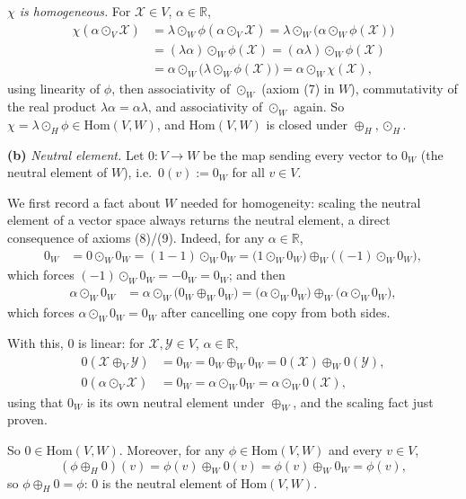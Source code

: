 \documentclass[11pt]{article}
\begin{document}
\emph{$\chi$ is homogeneous.} For $\mathcal X\in V$, $\alpha\in\mathbb R$,
\begin{align*}
\chi(\alpha\odot_V\mathcal X) &= \lambda\odot_W\phi(\alpha\odot_V\mathcal X) = \lambda\odot_W\big(\alpha\odot_W\phi(\mathcal X)\big) \\
&= (\lambda\alpha)\odot_W\phi(\mathcal X) = (\alpha\lambda)\odot_W\phi(\mathcal X) \\
&= \alpha\odot_W\big(\lambda\odot_W\phi(\mathcal X)\big) = \alpha\odot_W\chi(\mathcal X),
\end{align*}
using linearity of $\phi$, then associativity of $\odot_W$ (axiom (7) in $W$), commutativity of the real product $\lambda\alpha=\alpha\lambda$, and associativity of $\odot_W$ again. So $\chi=\lambda\odot_H\phi\in\mathrm{Hom}(V,W)$, and $\mathrm{Hom}(V,W)$ is closed under $\oplus_H,\odot_H$.

\textbf{(b)} \emph{Neutral element.} Let $0:V\to W$ be the map sending every vector to $0_W$ (the neutral element of $W$), i.e.\ $0(v):=0_W$ for all $v\in V$.

We first record a fact about $W$ needed for homogeneity: scaling the neutral element of a vector space always returns the neutral element, a direct consequence of axioms (8)/(9). Indeed, for any $\alpha\in\mathbb R$,
\begin{align*}
0_W &= 0\odot_W0_W = (1-1)\odot_W0_W = \big(1\odot_W0_W\big)\oplus_W\big((-1)\odot_W0_W\big),
\end{align*}
which forces $(-1)\odot_W0_W=-0_W=0_W$; and then
\begin{align*}
\alpha\odot_W0_W &= \alpha\odot_W\big(0_W\oplus_W0_W\big) = \big(\alpha\odot_W0_W\big)\oplus_W\big(\alpha\odot_W0_W\big),
\end{align*}
which forces $\alpha\odot_W0_W=0_W$ after cancelling one copy from both sides.

With this, $0$ is linear: for $\mathcal X,\mathcal Y\in V$, $\alpha\in\mathbb R$,
\begin{align*}
0(\mathcal X\oplus_V\mathcal Y) &= 0_W = 0_W\oplus_W0_W = 0(\mathcal X)\oplus_W0(\mathcal Y), \\
0(\alpha\odot_V\mathcal X) &= 0_W = \alpha\odot_W0_W = \alpha\odot_W0(\mathcal X),
\end{align*}
using that $0_W$ is its own neutral element under $\oplus_W$, and the scaling fact just proven.

So $0\in\mathrm{Hom}(V,W)$. Moreover, for any $\phi\in\mathrm{Hom}(V,W)$ and every $v\in V$,
\[
(\phi\oplus_H0)(v)=\phi(v)\oplus_W0(v)=\phi(v)\oplus_W0_W=\phi(v),
\]
so $\phi\oplus_H0=\phi$: $0$ is the neutral element of $\mathrm{Hom}(V,W)$.
\end{document}
